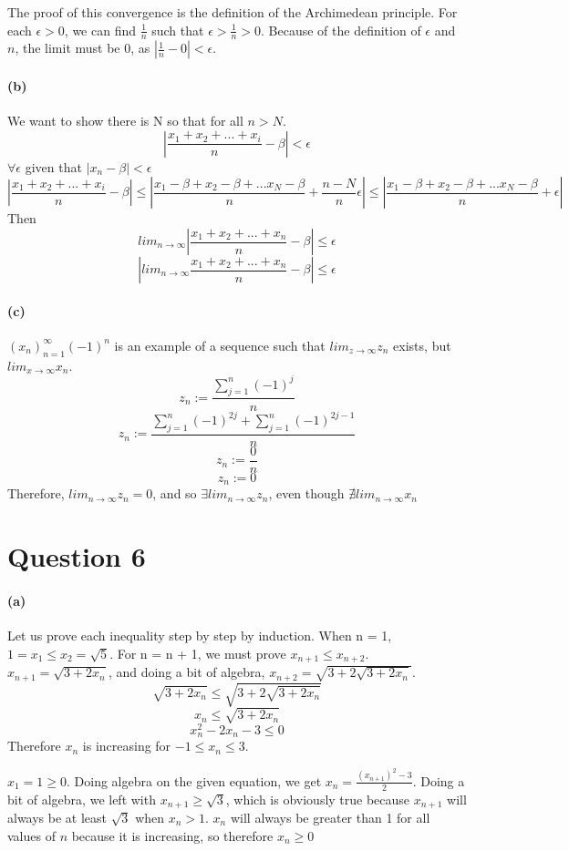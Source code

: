 \documentclass[10pt,letter]{article}
\begin{document}
The proof of this convergence is the definition of the Archimedean principle. For each $\epsilon > 0$, we can find $\frac{1}{n}$ such that $\epsilon > \frac{1}{n} > 0$. Because of the definition of $\epsilon$ and $n$, the limit must be 0, as $|\frac{1}{n} - 0 | < \epsilon$. 

\paragraph{(b)}
We want to show there is N so that for all $n > N$. 
$$|\frac{x_1+x_2+...+x_i}{n} - \beta| < \epsilon$$ $\forall \epsilon$ given that $|x_n - \beta| < \epsilon $
$$|\frac{x_1+x_2+...+x_i}{n} - \beta| \leq |\frac{x_1 - \beta + x_2 - \beta + ... x_N - \beta}{n} + \frac{n-N}{n}\epsilon| \leq |\frac{x_1 - \beta + x_2 - \beta + ... x_N - \beta}{n} + \epsilon|$$
Then 
$$lim_{n\rightarrow\infty}|\frac{x_1+x_2+...+x_n}{n} - \beta| \leq \epsilon$$
$$|lim_{n\rightarrow\infty}\frac{x_1+x_2+...+x_n}{n} - \beta| \leq \epsilon$$

\paragraph{(c)} 
$(x_n)_{n=1}^\infty(-1)^n$ is an example of a sequence such that $lim_{z\rightarrow\infty} z_n$ exists, but $lim_{x\rightarrow\infty} x_n$. 
$$z_n := \frac{\sum_{j=1}^n(-1)^j}{n}$$
$$z_n := \frac{\sum_{j=1}^n(-1)^{2j} + \sum_{j=1}^n(-1)^{2j-1}}{n}$$
$$z_n := \frac{0}{n}$$
$$z_n := 0$$
Therefore, $lim_{n\rightarrow\infty}z_n = 0$, and so $\exists lim_{n\rightarrow\infty}z_n$, even though $\nexists lim_{n\rightarrow\infty}x_n$


\section*{Question 6}

\paragraph{(a)} 
Let us prove each inequality step by step by induction. When n = 1, $1 = x_1 \leq x_2 = \sqrt{5}$. For n = n + 1, we must prove $x_{n+1} \leq x_{n+2}$. $x_{n+1} = \sqrt{3+2x_n}$, and doing a bit of algebra, $x_{n+2} = \sqrt{3+2\sqrt{3+2x_n}}$. 
$$\sqrt{3+2x_n} \leq \sqrt{3+2\sqrt{3+2x_n}}$$
$$x_n \leq \sqrt{3+2x_n}$$
$$x_n^2 - 2x_n - 3 \leq 0$$
Therefore $x_n$ is increasing for $-1 \leq x_n \leq 3$. 

$x_1 = 1 \geq 0$. Doing algebra on the given equation, we get $x_n = \frac{(x_{n+1})^2 - 3}{2}$. Doing a bit of algebra, we left with $x_{n+1} \geq \sqrt{3}$, which is obviously true because $x_{n+1}$ will always be at least $\sqrt{3}$ when $x_n>1$. $x_n$ will always be greater than 1 for all values of $n$ because it is increasing, so therefore $x_n \geq 0$
\end{document}
